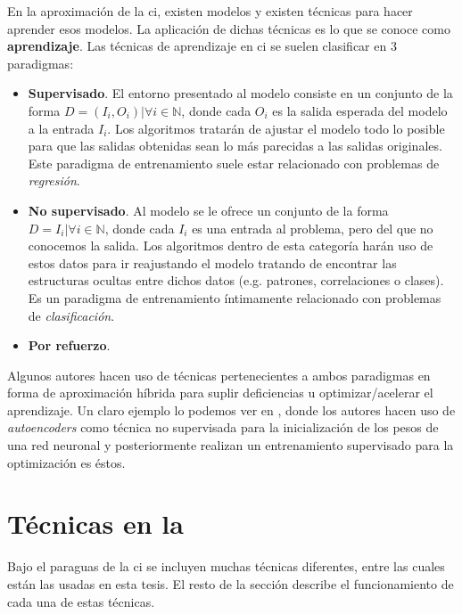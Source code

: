 En la aproximación de la \gls{ci}, existen modelos y existen técnicas para hacer aprender esos modelos. La aplicación de dichas técnicas es lo que se conoce como \textbf{aprendizaje}. Las técnicas de aprendizaje en \gls{ci} se suelen clasificar en $3$ paradigmas:

\begin{itemize}
	\item \textbf{Supervisado}. El entorno presentado al modelo consiste en un conjunto de la forma $D = {(I_i, O_i) | \forall i \in \mathbb{N}}$, donde cada $O_i$ es la salida esperada del modelo a la entrada $I_i$. Los algoritmos tratarán de ajustar el modelo todo lo posible para que las salidas obtenidas sean lo más parecidas a las salidas originales. Este paradigma de entrenamiento suele estar relacionado con problemas de \textit{regresión}.
	\item \textbf{No supervisado}. Al modelo se le ofrece un conjunto de la forma $D = {I_i | \forall i \in \mathbb{N}}$, donde cada $I_i$ es una entrada al problema, pero del que no conocemos la salida. Los algoritmos dentro de esta categoría harán uso de estos datos para ir reajustando el modelo tratando de encontrar las estructuras ocultas entre dichos datos (e.g. patrones, correlaciones o clases). Es un paradigma de entrenamiento íntimamente relacionado con problemas de \textit{clasificación}.
	\item \textbf{Por refuerzo}. 
\end{itemize}

Algunos autores hacen uso de técnicas pertenecientes a ambos paradigmas en forma de aproximación híbrida para suplir deficiencias u optimizar/acelerar el aprendizaje. Un claro ejemplo lo podemos ver en \cite{Hinton2006}, donde los autores hacen uso de \textit{autoencoders} como técnica no supervisada para la inicialización de los pesos de una red neuronal y posteriormente realizan un entrenamiento supervisado para la optimización es éstos.

\section{Técnicas en la }

Bajo el paraguas de la \ac{ci} se incluyen muchas técnicas diferentes, entre las cuales están las usadas en esta tesis. El resto de la sección describe el funcionamiento de cada una de estas técnicas. 

